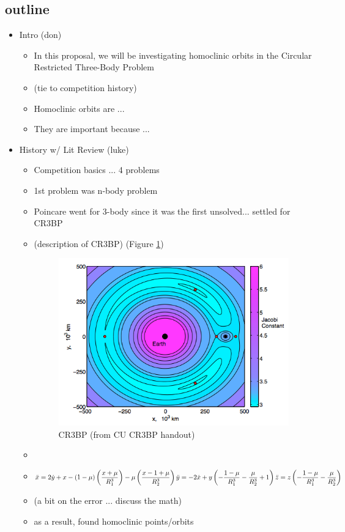 \documentclass{article}
\begin{document}
\subsection{outline}
\begin{itemize}
	\item Intro (don)
	  \begin{itemize}
	  	\item In this proposal, we will be investigating homoclinic orbits in the Circular Restricted Three-Body Problem
	  	\item (tie to competition history)
	  	\item Homoclinic orbits are ... 
	  	\item They are important because ...
	  \end{itemize}
	\item History w/ Lit Review (luke)
	  \begin{itemize}
	  	\item Competition basics ... 4 problems
	  	\item 1st problem was n-body problem
	  	\item Poincare went for 3-body since it was the first unsolved... settled for CR3BP 
	  	\item (description of CR3BP) (Figure \ref{fig:CR3BP_EarthMoon})
			\begin{figure}
			\centering
			\includegraphics[scale=0.7]{CR3BP_EarthMoon.png}
			\caption{CR3BP (from CU CR3BP handout)}
			\label{fig:CR3BP_EarthMoon}
			\end{figure}
		\item
	  	\item $\ddot{x} =  2\dot{y} + x - (1-\mu)\left(\dfrac{x+\mu}{R_1^3}\right) - \mu\left(\dfrac{x-1+\mu}{R_2^3}\right)\\
		\ddot{y} = - 2\dot{x} + y\left(-\dfrac{1-\mu}{R_1^3} - \dfrac{\mu}{R_2^3} + 1\right) \\
		\ddot{z} = z\left(-\dfrac{1 - \mu}{R_1^3} - \dfrac{\mu}{R_2^3}\right)$
	  	\item (a bit on the error ... discuss the math)
	  	\item as a result, found homoclinic points/orbits


\end{itemize}
\end{itemize}
\end{document}
